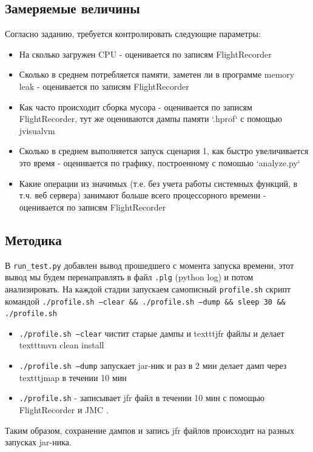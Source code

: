 \documentclass{article}
\begin{document}
	\subsection*{Замеряемые величины}
	Согласно заданию, требуется контролировать следующие параметры:
		\begin{itemize}
			\item На сколько загружен CPU - оценивается по записям FlightRecorder
			\item Сколько в среднем потребляется памяти, заметен ли в программе memory leak - оценивается по записям FlightRecorder
			\item Как часто происходит сборка мусора - оценивается по записям FlightRecorder, тут же оцениваются дампы памяти `.hprof` с помощью jvisualvm
			\item Сколько в среднем выполняется запуск сценария 1, как быстро увеличивается это время - оценивается по графику, построенному с помошью `analyze.py` 
			\item Какие операции из значимых (т.е. без учета работы системных функций, в т.ч. веб сервера) занимают больше всего процессорного времени - оценивается по записям FlightRecorder
		\end{itemize}
	
	\subsection*{Методика}
	В \texttt{run\_test.py} добавлен вывод прошедшего с момента запуска времени, этот вывод мы будем перенаправлять в файл \texttt{.plg} (python log) и потом анализировать.
	На каждой стадии запускаем самописный \texttt{profile.sh} скрипт командой
	\texttt{./profile.sh --clear \&\& ./profile.sh --dump \&\& sleep 30 \&\& ./profile.sh}

		\begin{itemize}
			\item \texttt{./profile.sh --clear} чистит старые дампы и texttt{jfr} файлы и делает texttt{mvn clean install}
			\item \texttt{./profile.sh --dump} запускает jar-ник и раз в 2 мин делает дамп через texttt{jmap} в течении 10 мин
			\item \texttt{./profile.sh} - записывает jfr файл в течении 10 мин с помощью FlightRecorder и JMC .
		\end{itemize}

	Таким образом, сохранение дампов и запись jfr файлов происходит на разных запусках jar-ника.
\end{document}
